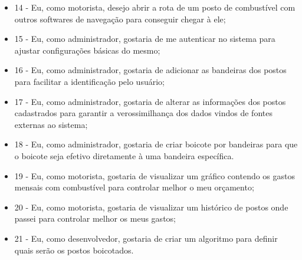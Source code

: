 \begin{itemize}
    \item 14 - Eu, como motorista, desejo abrir a rota de um posto de combustível com outros softwares de navegação para conseguir chegar à ele;
    \item 15 - Eu, como administrador, gostaria de me autenticar no sistema para ajustar configurações básicas do mesmo;
    \item 16 - Eu, como administrador, gostaria de adicionar as bandeiras dos postos para facilitar a identificação pelo usuário;
    \item 17 - Eu, como administrador, gostaria de alterar as informações dos postos cadastrados para garantir a verossimilhança dos dados vindos de fontes externas ao sistema;
    \item 18 - Eu, como administrador, gostaria de criar boicote por bandeiras para que o boicote seja efetivo diretamente à uma bandeira específica.
    \item 19 - Eu, como motorista, gostaria de visualizar um gráfico contendo os gastos mensais com combustível para controlar melhor o meu orçamento;
    \item 20 - Eu, como motorista, gostaria de visualizar um histórico de postos onde passei para controlar melhor os meus gastos;
    \item 21 - Eu, como desenvolvedor, gostaria de criar um algoritmo para definir quais serão os postos boicotados.
\end{itemize}



